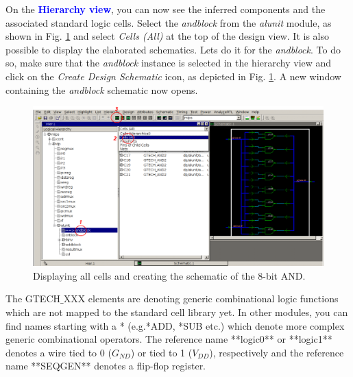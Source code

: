 On the \textbf{\textcolor{blue}{Hierarchy view}}, you can now see the inferred components and the associated standard logic cells. Select the \textit{andblock} from the \textit{alunit} module, as shown in Fig. \ref{fig_cellall} and select \textit{Cells (All)} at the top of the design view. It is also possible to display the elaborated schematics. Lets do it for the \textit{andblock}. To do so, make sure that the \textit{andblock} instance is selected in the hierarchy view and click on the \textit{Create Design Schematic} icon, as depicted in Fig. \ref{fig_cellall}. A new window containing the \textit{andblock} schematic now opens.

	\begin{figure}[!h]
	\centering
	\includegraphics[scale=0.32]{figures/lab3_design_compiler/cellall.pdf}
	\caption{Displaying all cells and creating the schematic of the 8-bit AND.}
	\label{fig_cellall}
\end{figure}
		\vspace{-6mm}
\begin{remark}
 The GTECH$\_$XXX elements are denoting generic combinational logic functions which are not mapped to the standard cell library yet. In other modules, you can find names starting with a * (e.g.*ADD, *SUB etc.) which denote more complex generic combinational operators. The reference name **logic0** or **logic1** denotes a wire tied to 0 ($G_{ND}$) or tied to 1 ($V_{DD}$), respectively and the reference name **SEQGEN** denotes a flip-flop register.
 \end{remark}
 

